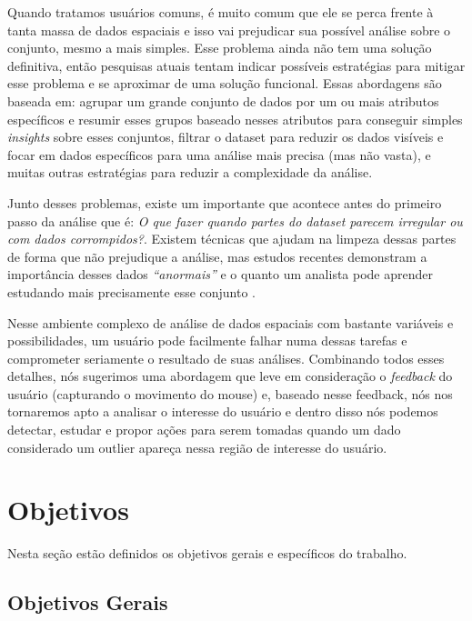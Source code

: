 Quando tratamos usuários comuns, é muito comum que ele se perca frente à tanta massa de dados espaciais e isso vai prejudicar sua possível análise sobre o conjunto, mesmo a mais simples. Esse problema ainda não tem uma solução definitiva, então pesquisas atuais tentam indicar possíveis estratégias para mitigar esse problema e se aproximar de uma solução funcional. Essas abordagens são baseada em: agrupar um grande conjunto de dados por um ou mais atributos específicos e resumir esses grupos baseado nesses atributos para conseguir simples \textit{insights} sobre esses conjuntos, filtrar o dataset para reduzir os dados visíveis e focar em dados específicos para uma análise mais precisa (mas não vasta), e muitas outras estratégias para reduzir a complexidade da análise.

Junto desses problemas, existe um importante que acontece antes do primeiro passo da análise que é: \textit{O que fazer quando partes do dataset parecem irregular ou com dados corrompidos?}. Existem técnicas que ajudam na limpeza dessas partes de forma que não prejudique a análise, mas estudos recentes demonstram a importância desses dados \textit{``anormais''} e o quanto um analista pode aprender estudando mais precisamente esse conjunto \cite{DBLP:journals/debu/FreireCVZ16}.

Nesse ambiente complexo de análise de dados espaciais com bastante variáveis e possibilidades, um usuário pode facilmente falhar numa dessas tarefas e comprometer seriamente o resultado de suas análises. Combinando todos esses detalhes, nós sugerimos uma abordagem que leve em consideração o \textit{feedback} do usuário (capturando o movimento do mouse) e, baseado nesse feedback, nós nos tornaremos apto a analisar o interesse do usuário e dentro disso nós podemos detectar, estudar e propor ações para serem tomadas quando um dado considerado um outlier apareça nessa região de interesse do usuário.

\section{Objetivos}

Nesta seção estão definidos os objetivos gerais e específicos do trabalho.

\subsection{Objetivos Gerais}

